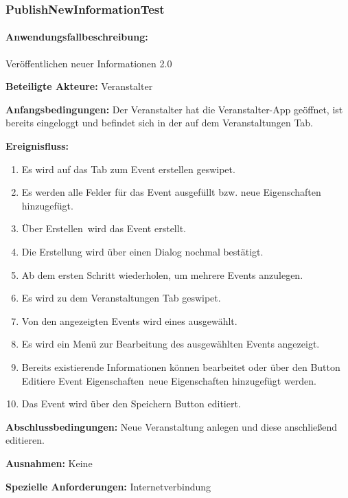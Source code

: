 \subsubsection{PublishNewInformationTest}
\paragraph{Anwendungsfallbeschreibung:} Veröffentlichen neuer Informationen 2.0

\textbf{Beteiligte Akteure:}
	Veranstalter
	
\textbf{Anfangsbedingungen:}
	Der Veranstalter hat die Veranstalter-App geöffnet, ist bereits eingeloggt und befindet sich in der  auf dem Veranstaltungen Tab.
	
\textbf{Ereignisfluss:}
	\begin{enumerate}
		\item Es wird  auf das Tab zum Event erstellen geswipet.
		\item Es werden alle Felder für das Event ausgefüllt bzw. neue Eigenschaften hinzugefügt.
		\item Über \glqq Erstellen\grqq\ wird das Event erstellt.
		\item Die Erstellung wird über einen Dialog nochmal bestätigt.
		\item Ab dem ersten Schritt wiederholen, um mehrere Events anzulegen.
		\item Es wird zu dem Veranstaltungen Tab geswipet.
		\item Von den angezeigten Events wird eines ausgewählt.
		\item Es wird ein Menü zur Bearbeitung des ausgewählten Events angezeigt.
		\item Bereits existierende Informationen können bearbeitet oder über den Button \glqq Editiere Event Eigenschaften\grqq\ neue Eigenschaften hinzugefügt werden.
		\item Das Event wird über den Speichern Button editiert.
	\end{enumerate}
	
\textbf{Abschlussbedingungen:}
	Neue Veranstaltung anlegen und diese anschließend editieren.
	
\textbf{Ausnahmen:}
	Keine
	
\textbf{Spezielle Anforderungen:}
	Internetverbindung


